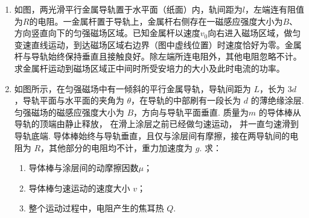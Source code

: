 \begin{enumerate}





\item 
{}
如图，两光滑平行金属导轨置于水平面（纸面）内，轨间距为$ l $，左端连有阻值为$ R $的电阻。一金属杆置于导轨上，金属杆右侧存在一磁感应强度大小为$ B $、方向竖直向下的匀强磁场区域。已知金属杆以速度$ v_{0} $向右进入磁场区域，做匀变速直线运动，到达磁场区域右边界（图中虚线位置）时速度恰好为零。金属杆与导轨始终保持垂直且接触良好。除左端所连电阻外，其他电阻忽略不计。求金属杆运动到磁场区域正中间时所受安培力的大小及此时电流的功率。
\begin{figure}[h!]
\flushright 

\end{figure}



\newpage
\item 
{}
如图所示，在匀强磁场中有一倾斜的平行金属导轨，导轨间距为 $ L $，长为 $ 3 d $，导轨平面与水平面的夹角为 $ \theta $，在导轨的中部刷有一段长为 $ d $ 的薄绝缘涂层. 匀强磁场的磁感应强度大小为 $ B $，方向与导轨平面垂直. 质量为$ m $ 的导体棒从导轨的顶端由静止释放， 在滑上涂层之前已经做匀速运动， 并一直匀速滑到导轨底端. 导体棒始终与导轨垂直，且仅与涂层间有摩擦，接在两导轨间的电阻为 $ R $，其他部分的电阻均不计，重力加速度为 $ g $. 求： 

\begin{enumerate}
\renewcommand{\labelenumi}{\arabic{enumi}.}
\item
导体棒与涂层间的动摩擦因数$ \mu $； 
\item 
导体棒匀速运动的速度大小 $ v $；
\item 
整个运动过程中，电阻产生的焦耳热 $ Q $.




\end{enumerate}
\end{enumerate}
